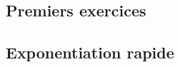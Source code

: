 

\usepackage{parcolumns}
\setlength{\parindent}{0pt}

 

\subsection{Premiers exercices}


\subsection{Exponentiation rapide}


